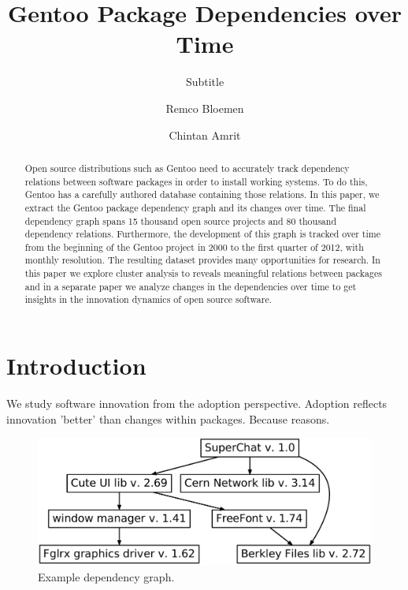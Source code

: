 \documentclass[smallextended,final]{svjour3}
\begin{document}
\title{Gentoo Package Dependencies over Time}
\subtitle{Subtitle}
\dedication{}
\author{Remco Bloemen \and Chintan Amrit}

\maketitle

\tableofcontents

\begin{abstract}
Open source distributions such as Gentoo need to accurately track dependency relations between software packages in order to install working systems. To do this, Gentoo has a carefully authored database containing those relations. In this paper, we extract the Gentoo package dependency graph and its changes over time. The final dependency graph spans 15 thousand open source projects and 80 thousand dependency relations. Furthermore, the development of this graph is tracked over time from the beginning of the Gentoo project in 2000 to the first quarter of 2012, with monthly resolution. The resulting dataset provides many opportunities for research. In this paper we explore cluster analysis to reveals meaningful relations between packages and in a separate paper we analyze changes in the dependencies over time to get insights in the innovation dynamics of open source software.
\end{abstract}


\section{Introduction}

We study software innovation from the adoption perspective. Adoption reflects innovation 'better' than changes within packages. Because reasons.

\begin{figure}
\centering
\includegraphics[width=\linewidth]{depgraph.pdf}
\caption{Example dependency graph.}\label{fig:depgraph-chat}
\vspace{-1em}
\end{figure}
\end{document}
